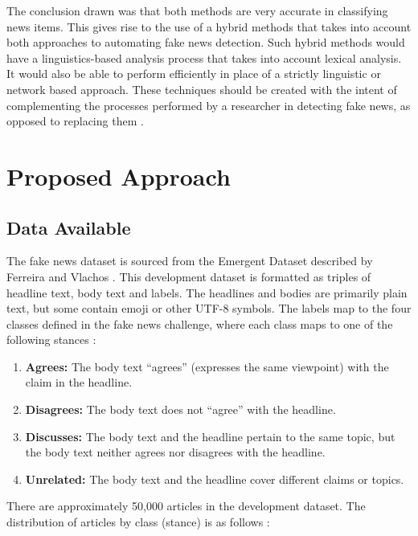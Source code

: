 \documentclass[11pt,a4paper]{article}
\begin{document}
The conclusion drawn was that both methods are very accurate in classifying news items. This gives rise to the use of a hybrid methods that takes into account both approaches to automating fake news detection. Such hybrid methods would have a linguistics-based analysis process that takes into account lexical analysis. It would also be able to perform efficiently in place of a strictly linguistic or network based approach. These techniques should be created with the intent of complementing the processes performed by a researcher in detecting fake news, as opposed to replacing them \cite{conroy2015automatic}. \\


\section{Proposed Approach}

\subsection{Data Available}

The fake news dataset is sourced from the Emergent Dataset described by Ferreira and Vlachos \cite{ferreira2016emergent}. This development dataset is formatted as triples of headline text, body text and labels. The headlines and bodies are primarily plain text, but some contain emoji or other UTF-8 symbols. The labels map to the four classes defined in the fake news challenge, where each class maps to one of the following stances \cite{fakenewschallenge}:

\begin{enumerate}
\item \textbf{Agrees:} The body text “agrees” (expresses the same viewpoint) with the claim in the headline.
\item \textbf{Disagrees:} The body text does not “agree” with the headline.
\item \textbf{Discusses:} The body text and the headline pertain to the same topic, but the body text neither agrees nor disagrees with the headline.
\item \textbf{Unrelated:} The body text and the headline cover different claims or topics.
\end{enumerate}

There are approximately 50,000 articles in the development dataset. The distribution of articles by class (stance) is as follows \cite{fnc1github}: \\
\end{document}
